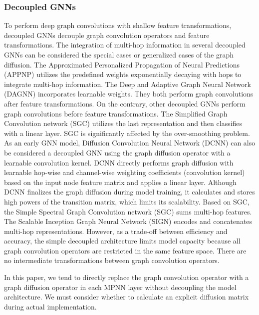 \documentclass{article}
\begin{document}
\subsubsection{Decoupled GNNs}
To perform deep graph convolutions with shallow feature transformations, decoupled GNNs decouple graph convolution operators and feature transformations. The integration of multi-hop information in several decoupled GNNs can be considered the special cases \cite{wu2019simplifying, klicpera2018predict, zhu2021simple} or generalized cases \cite{liu2020towards} of the graph diffusion. The Approximated Personalized Propagation of Neural Predictions (APPNP) \cite{klicpera2018predict} utilizes the predefined weights exponentially decaying with hops to integrate multi-hop information. The Deep and Adaptive Graph Neural Network (DAGNN) \cite{liu2020towards} incorporates learnable weights. They both perform graph convolutions after feature transformations. On the contrary, other decoupled GNNs \cite{wu2019simplifying, zhu2021simple, rossi2020sign} perform graph convolutions before feature transformations. The Simplified Graph Convolution network (SGC) \cite{wu2019simplifying} utilizes the last representation and then classifies with a linear layer. SGC is significantly affected by the over-smoothing problem. As an early GNN model, Diffusion Convolution Neural Network (DCNN) \cite{atwood2016diffusion} can also be considered a decoupled GNN using the graph diffusion operator with a learnable convolution kernel. DCNN directly performs graph diffusion with learnable hop-wise and channel-wise weighting coefficients (convolution kernel) based on the input node feature matrix and applies a linear layer. Although DCNN finalizes the graph diffusion during model training, it calculates and stores high powers of the transition matrix, which limits its scalability. Based on SGC, the Simple Spectral Graph Convolution network (SGC) sums multi-hop features. The Scalable Inception Graph Neural Network (SIGN) \cite{rossi2020sign} encodes and concatenates multi-hop representations. However, as a trade-off between efficiency and accuracy, the simple decoupled architecture limits model capacity because all graph convolution operators are restricted in the same feature space. There are no intermediate transformations between graph convolution operators. 

In this paper, we tend to directly replace the graph convolution operator with a graph diffusion operator in each MPNN layer without decoupling the model architecture. We must consider whether to calculate an explicit diffusion matrix during actual implementation.
\end{document}
